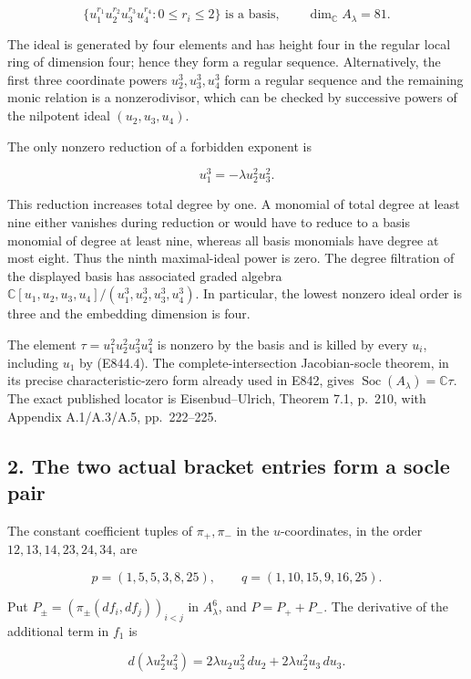 \[
 \{u_1^{r_1}u_2^{r_2}u_3^{r_3}u_4^{r_4}:0\le r_i\le2\}
 \text{ is a basis},\qquad \dim_{\mathbb C}A_\lambda=81.
 \tag{E844.3}
\]

The ideal is generated by four elements and has height four in the regular
local ring of dimension four; hence they form a regular sequence.
Alternatively, the first three coordinate powers \(u_2^3,u_3^3,u_4^3\)
form a regular sequence and the remaining monic relation is a nonzerodivisor,
which can be checked by successive powers of the nilpotent ideal
\((u_2,u_3,u_4)\).

The only nonzero reduction of a forbidden exponent is

\[
                   u_1^3=-\lambda u_2^2u_3^2.
 \tag{E844.4}
\]

This reduction increases total degree by one. A monomial of total degree
at least nine either vanishes during reduction or would have to reduce
to a basis monomial of degree at least nine, whereas all basis monomials
have degree at most eight. Thus the ninth maximal-ideal power is zero.
The degree filtration of the displayed basis has associated graded algebra
\(\mathbb C[u_1,u_2,u_3,u_4]/(u_1^3,u_2^3,u_3^3,u_4^3)\).
In particular, the lowest nonzero ideal order is three and the embedding
dimension is four.

The element
\(\tau=u_1^2u_2^2u_3^2u_4^2\) is nonzero by the basis and is killed by
every \(u_i\), including \(u_1\) by (E844.4).
The complete-intersection Jacobian-socle theorem, in its precise
characteristic-zero form already used in E842, gives
\(\operatorname{Soc}(A_\lambda)=\mathbb C\tau\). The exact published locator is Eisenbud--Ulrich, Theorem 7.1, p.~210, with Appendix A.1/A.3/A.5, pp.~222--225.\cite{SFEisenbudUlrich2019}

\subsection{2. The two actual bracket entries form a socle pair}\label{SF-E844:the-two-actual-bracket-entries-form-a-socle-pair}

The constant coefficient tuples of \(\pi_+,\pi_-\) in the \(u\)-coordinates,
in the order \(12,13,14,23,24,34\), are

\[
 p=(1,5,5,3,8,25),\qquad q=(1,10,15,9,16,25).
 \tag{E844.5}
\]

Put \(P_\pm=(\pi_\pm(df_i,df_j))_{i<j}\) in \(A_\lambda^6\), and
\(P=P_++P_-\). The derivative of the additional term in \(f_1\) is

\[
 d(\lambda u_2^2u_3^2)
       =2\lambda u_2u_3^2\,du_2+2\lambda u_2^2u_3\,du_3.
 \tag{E844.6}
\]

